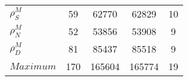 \begin{center}
\begin{longtable}{lcccc}
$ {\rho^{M}_{S}}       $	 & 	                   59	 & 	                62770	 & 	                62829	 & 	                   10 \\ 
$ {\rho^{M}_{N}}       $	 & 	                   52	 & 	                53856	 & 	                53908	 & 	                    9 \\ 
$ {\rho^{M}_{D}}       $	 & 	                   81	 & 	                85437	 & 	                85518	 & 	                    9 \\ 
$Maximum               $	 & 	                  170	 & 	               165604	 & 	               165774	 & 	                   19 \\ 
\end{longtable}
 \end{center}
